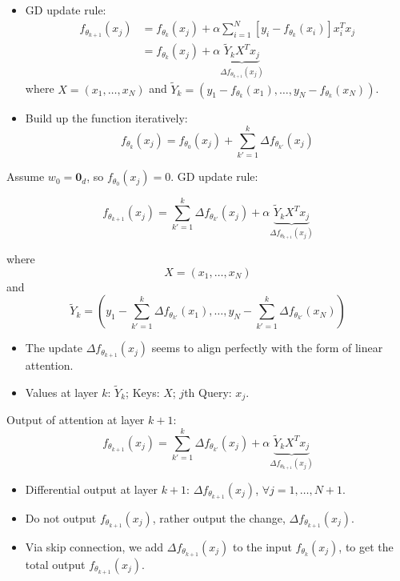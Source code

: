 \documentclass[12pt]{extarticle}
\begin{document}
\begin{itemize}
    \item GD update rule:
    \[
    \begin{aligned}
    f_{\theta_{k+1}}(x_j) &= f_{\theta_k}(x_j) + \alpha \sum_{i=1}^N [y_i - f_{\theta_k}(x_i)] x_i^T x_j \\
    &= f_{\theta_k}(x_j) + \alpha \underbrace{\tilde{Y}_k X^T x_j}_{\Delta f_{\theta_{k+1}}(x_j)}
    \end{aligned}
    \]
    where $X = (x_1, \ldots, x_N)$ and $\tilde{Y}_k = (y_1 - f_{\theta_k}(x_1), \ldots, y_N - f_{\theta_k}(x_N))$.
    
    \item Build up the function iteratively:
    \[
    f_{\theta_k}(x_j) = f_{\theta_0}(x_j) + \sum_{k'=1}^k \Delta f_{\theta_{k'}}(x_j)
    \]
\end{itemize}

Assume $w_0 = \mathbf{0}_d$, so $f_{\theta_0}(x_j) = 0$. GD update rule:

\[
f_{\theta_{k+1}}(x_j) = \sum_{k'=1}^k \Delta f_{\theta_{k'}}(x_j) + \alpha \underbrace{\tilde{Y}_k X^T x_j}_{\Delta f_{\theta_{k+1}}(x_j)}
\]

where
\[
X = (x_1, \ldots, x_N)
\]
and
\[
\tilde{Y}_k = \left(y_1 - \sum_{k'=1}^k \Delta f_{\theta_{k'}}(x_1), \ldots, y_N - \sum_{k'=1}^k \Delta f_{\theta_{k'}}(x_N)\right)
\]

\begin{itemize}
    \item The update $\Delta f_{\theta_{k+1}}(x_j)$ seems to align perfectly with the form of linear attention.
    
    \item Values at layer $k$: $\tilde{Y}_k$; Keys: $X$; $j$th Query: $x_j$.
\end{itemize}

Output of attention at layer $k + 1$:
\[
f_{\theta_{k+1}}(x_j) = \sum_{k'=1}^k \Delta f_{\theta_{k'}}(x_j) + \alpha \underbrace{\tilde{Y}_k X^T x_j}_{\Delta f_{\theta_{k+1}}(x_j)}
\]

\begin{itemize}
    \item Differential output at layer $k+1$: $\Delta f_{\theta_{k+1}}(x_j)$, $\forall j = 1, \ldots, N+1$.
    
    \item Do not output $f_{\theta_{k+1}}(x_j)$, rather output the change, $\Delta f_{\theta_{k+1}}(x_j)$.
    
    \item Via skip connection, we add $\Delta f_{\theta_{k+1}}(x_j)$ to the input $f_{\theta_k}(x_j)$, to get the total output $f_{\theta_{k+1}}(x_j)$.
\end{itemize}
\end{document}
